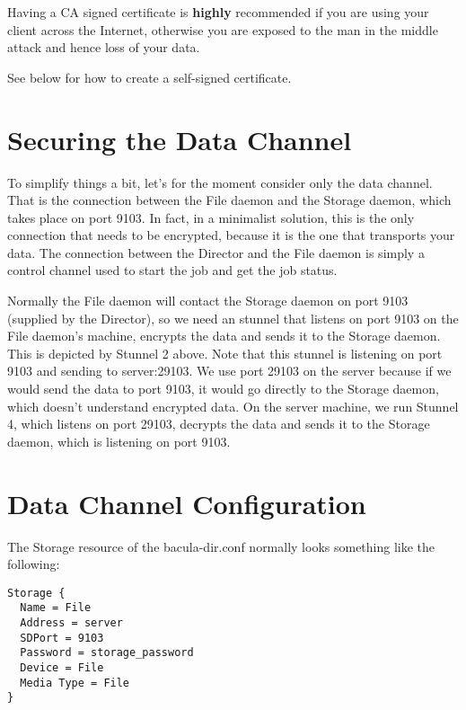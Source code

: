 Having a CA signed certificate is {\bf highly} recommended if you are using
your client across the Internet, otherwise you are exposed to the man in the
middle attack and hence loss of your data.

See below for how to create a self-signed certificate.

\section{Securing the Data Channel}

To simplify things a bit, let's for the moment consider only the data channel.
That is the connection between the File daemon and the Storage daemon, which
takes place on port 9103. In fact, in a minimalist solution, this is the only
connection that needs to be encrypted, because it is the one that transports your
data. The connection between the Director and the File daemon is simply a
control channel used to start the job and get the job status.

Normally the File daemon will contact the Storage daemon on port 9103
(supplied by the Director), so we need an stunnel that listens on port 9103 on
the File daemon's machine, encrypts the data and sends it to the Storage
daemon. This is depicted by Stunnel 2 above. Note that this stunnel is
listening on port 9103 and sending to server:29103. We use port 29103 on the
server because if we would send the data to port 9103, it would go directly to the
Storage daemon, which doesn't understand encrypted data. On the server
machine, we run Stunnel 4, which listens on port 29103, decrypts the data and
sends it to the Storage daemon, which is listening on port 9103.

\section{Data Channel Configuration}

The Storage resource of the bacula-dir.conf normally looks something like the
following:

\footnotesize
\begin{verbatim}
Storage {
  Name = File
  Address = server
  SDPort = 9103
  Password = storage_password
  Device = File
  Media Type = File
}
\end{verbatim}
\normalsize

